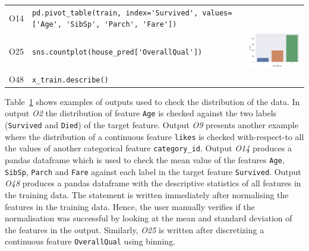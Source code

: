 \begin{table}
\begin{tabular}{@{}m{} m{} m{}@{}}
    O14&
    \lstinline[]$pd.pivot_table(train, index='Survived', values=['Age', 'SibSp', 'Parch', 'Fare'])$&
    \\

    O25&
    \lstinline[]$sns.countplot(house_pred['OverallQual'])$&
    \includegraphics[width=\linewidth]{o25.png}\\

    O48&
    \lstinline[]$x_train.describe()$&
    \\

    \bottomrule
  \end{tabular}
  \label{tab:distribution-check}
\end{table}

Table~\ref{tab:distribution-check} shows examples of outputs used to check the distribution of the data. In output \emph{O2} the distribution of feature \texttt{Age} is checked against the two labels (\texttt{Survived} and \texttt{Died}) of the target feature. Output \emph{O9} presents another example where the distribution of a continuous feature \texttt{likes} is checked with-respect-to all the values of another categorical feature \texttt{category\_id}. Output \emph{O14} produces a pandas dataframe which is used to check the mean value of the features \texttt{Age}, \texttt{SibSp}, \texttt{Parch} and \texttt{Fare} against each label in the target feature \texttt{Survived}. Output \emph{O48} produces a pandas dataframe with the descriptive statistics of all features in the training data. The statement is written immediately after normalising the features in the training data. Hence, the user manually verifies if the normalisation was successful by looking at the mean and standard deviation of the features in the output. Similarly, \emph{O25} is written after discretizing a continuous feature \texttt{OverallQual} using binning. 

